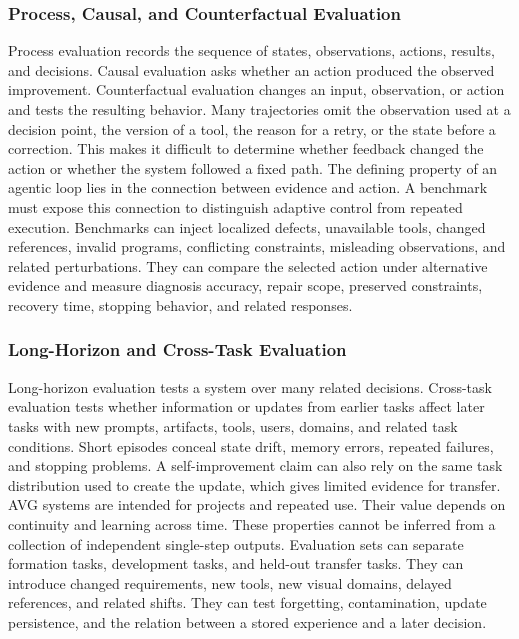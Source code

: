 \subsubsection{Process, Causal, and Counterfactual Evaluation}

Process evaluation records the sequence of states, observations, actions, results, and decisions. Causal evaluation asks whether an action produced the observed improvement. Counterfactual evaluation changes an input, observation, or action and tests the resulting behavior. Many trajectories omit the observation used at a decision point, the version of a tool, the reason for a retry, or the state before a correction. This makes it difficult to determine whether feedback changed the action or whether the system followed a fixed path. The defining property of an agentic loop lies in the connection between evidence and action. A benchmark must expose this connection to distinguish adaptive control from repeated execution. Benchmarks can inject localized defects, unavailable tools, changed references, invalid programs, conflicting constraints, misleading observations, and related perturbations. They can compare the selected action under alternative evidence and measure diagnosis accuracy, repair scope, preserved constraints, recovery time, stopping behavior, and related responses.


\subsubsection{Long-Horizon and Cross-Task Evaluation}

Long-horizon evaluation tests a system over many related decisions. Cross-task evaluation tests whether information or updates from earlier tasks affect later tasks with new prompts, artifacts, tools, users, domains, and related task conditions. Short episodes conceal state drift, memory errors, repeated failures, and stopping problems. A self-improvement claim can also rely on the same task distribution used to create the update, which gives limited evidence for transfer. AVG systems are intended for projects and repeated use. Their value depends on continuity and learning across time. These properties cannot be inferred from a collection of independent single-step outputs. Evaluation sets can separate formation tasks, development tasks, and held-out transfer tasks. They can introduce changed requirements, new tools, new visual domains, delayed references, and related shifts. They can test forgetting, contamination, update persistence, and the relation between a stored experience and a later decision.


